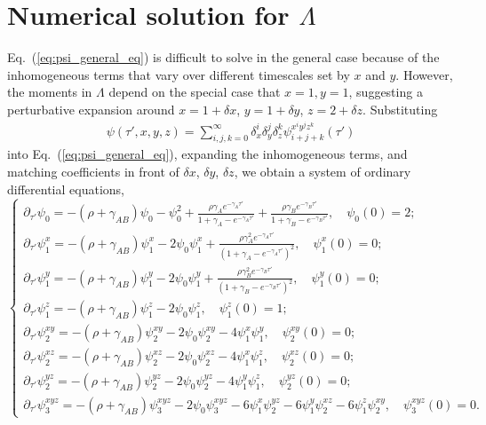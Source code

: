 \documentclass[aps,rmp,twocolumn,groupedaddress,floatfix,notitlepage]{revtex4-1}
\begin{document}
\section{Numerical solution for $\Lambda$}\label{appendix:numerics}
Eq.~(\ref{eq:psi_general_eq}) is difficult to solve in the general case because of the inhomogeneous terms that vary over different timescales set by $x$ and $y$. However, the moments in $\Lambda$ depend on the special case that $x=1, y=1$, suggesting a perturbative expansion around $x=1+\delta x$, $y=1+\delta y$, $z=2+\delta z$. Substituting
\begin{align}\label{eq:psi_xyz_expansion}
    \psi(\tau', x, y, z) 
    = \sum_{i, j, k=0}^{\infty} \delta_x^i \delta_y^j \delta_z^k \psi_{i + j + k}^{x^i y^j z^k}(\tau')
\end{align}
into Eq.~(\ref{eq:psi_general_eq}), expanding the inhomogeneous terms, and matching coefficients in front of $\delta x$, $\delta y$, $\delta z$, we obtain a system of ordinary differential equations, 
\begin{equation}\label{eq:psi_odes}
    \begin{cases}
    \partial_{\tau'} \psi_0 = -(\rho+\gamma_{AB})\psi_0 - \psi_0^2 + \frac{\rho \gamma_A e^{-\gamma_A \tau'}}{1 + \gamma_A - e^{-\gamma_A \tau'}} + \frac{\rho \gamma_B e^{-\gamma_B \tau'}}{1 + \gamma_B - e^{-\gamma_B \tau'}}, \quad \psi_0(0) = 2; \\
    
    \partial_{\tau'} \psi_1^x = -(\rho+\gamma_{AB}) \psi_1^x -2 \psi_0 \psi_1^x + \frac{\rho \gamma_A^2 e^{-\gamma_A \tau'}}{(1 + \gamma_A - e^{-\gamma_A \tau'})^2}, \quad \psi_1^x(0) = 0; \\
    
    \partial_{\tau'} \psi_1^y = -(\rho+\gamma_{AB}) \psi_1^y -2 \psi_0 \psi_1^y + \frac{\rho \gamma_B^2 e^{-\gamma_B \tau'}}{(1 + \gamma_B - e^{-\gamma_B \tau'})^2}, \quad \psi_1^y(0) = 0; \\
    
    \partial_{\tau'} \psi_1^z = -(\rho+\gamma_{AB}) \psi_1^z - 2 \psi_0 \psi_1^z, \quad \psi_1^z(0) = 1; \\
    
    \partial_{\tau'} \psi_2^{xy} = -(\rho+\gamma_{AB}) \psi_2^{xy} - 2 \psi_0 \psi_2^{xy} - 4 \psi_1^x \psi_1^y, \quad \psi_2^{xy}(0) = 0; \\
    
    \partial_{\tau'} \psi_2^{xz} = -(\rho+\gamma_{AB}) \psi_2^{xz} - 2 \psi_0 \psi_2^{xz} - 4 \psi_1^x \psi_1^z, \quad \psi_2^{xz}(0) = 0; \\
    
    \partial_{\tau'} \psi_2^{yz} = -(\rho+\gamma_{AB}) \psi_2^{yz} - 2 \psi_0 \psi_2^{yz} - 4 \psi_1^y \psi_1^z, \quad \psi_2^{yz}(0) = 0; \\
    
    \partial_{\tau'} \psi_3^{xyz} = -(\rho+\gamma_{AB}) \psi_3^{xyz} - 2 \psi_0 \psi_3^{xyz} - 6 \psi_1^x \psi_2^{yz} - 6 \psi_1^y \psi_2^{xz} - 6 \psi_1^z \psi_2^{xy}, \quad \psi_3^{xyz}(0) = 0. 
    \end{cases}
\end{equation}
\end{document}
